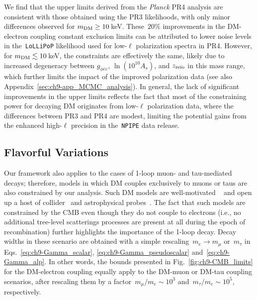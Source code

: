 We find that the upper limits derived from the \textit{Planck} PR4 analysis are consistent with those obtained using the PR3 likelihoods, with only minor differences observed for $m_{\rm{DM}}\geq 10\,$keV.
These~$20\%$ improvements in the DM-electron coupling constant exclusion limits can be attributed to lower noise levels in the~\texttt{LoLLiPoP} likelihood used for low-$\ell$ polarization spectra in PR4.
However, for $m_{\rm{DM}} \lesssim 10\,$keV, the constraints are effectively the same, likely due to increased degeneracy between $g_{\phi\bar{e}e}$, $\ln (10^{10} A_s)$, and $z_{\rm{reio}}$ in this mass range, which further limits the impact of the improved polarization data (see also Appendix~\ref{sec:ch9-app_MCMC_analysis}).
In general, the lack of significant improvements in the upper limits reflects the fact that most of the constraining power for decaying DM originates from low-$\ell$ polarization data, where the differences between PR3 and PR4 are modest, limiting the potential gains from the enhanced high-$\ell$ precision in the~\texttt{NPIPE} data release.



\subsection{Flavorful Variations}

Our framework also applies to the cases of 1-loop muon- and tau-mediated decays; therefore, models in which DM couples exclusively to muons or taus are also constrained by our analysis. Such DM models are well-motivated ~\cite{Ziegler:2019gjr, PANCI2023137919, Ziegler:2023aoe} and open up a host of collider~\cite{Bauer:2021mvw, 2025arXiv250106294L} and astrophysical probes~\cite{Bollig:2020xdr, Croon:2020lrf, Green:2021hjh, Caputo:2021rux}.
The fact that such models are constrained by the CMB even though they do not couple to electrons (i.e., no additional tree-level scatterings processes are present at all during the epoch of recombination) further highlights the importance of the 1-loop decay.
Decay widths in these scenario are obtained with a simple rescaling~$m_e \rightarrow m_{\mu}$ or~$ m_{\tau}$ in Eqs.~\eqref{eq:ch9-Gamma_scalar}, \eqref{eq:ch9-Gamma_pseudoscalar} and~\eqref{eq:ch9-Gamma_alp}.
In other words, the bounds presented in Fig.~\ref{fig:ch9-CMB_limits} for the DM-electron coupling equally apply to the DM-muon or DM-tau coupling scenarios, after rescaling them by a factor~$m_\mu/m_e \sim 10^3$ and~$m_\tau/m_e\sim 10^{5}$, respectively.


